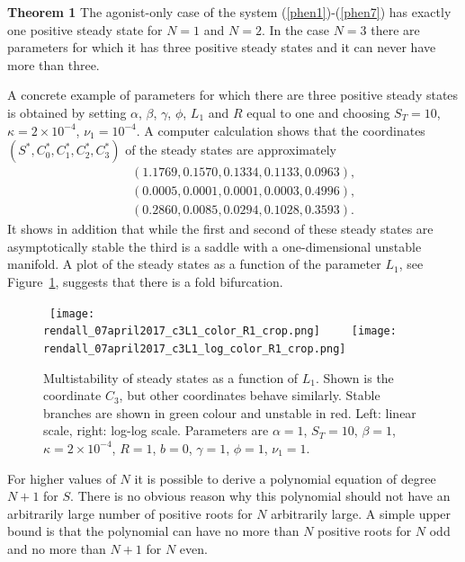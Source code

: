 \documentclass{article}
\begin{document}
\noindent
{\bf Theorem 1} The agonist-only case of the system (\ref{phen1})-(\ref{phen7})
has exactly one positive steady state for $N=1$ and $N=2$. In the case $N=3$ 
there are parameters for which it has three positive steady states and it can 
never have more than three. 

A concrete example of parameters for which there are three positive steady 
states is obtained by setting $\alpha$, $\beta$, $\gamma$, $\phi$, $L_1$ and 
$R$ equal to one and choosing $S_T=10$, $\kappa=2\times 10^{-4}$, 
$\nu_1=10^{-4}$. A computer calculation shows that the coordinates 
$(S^*,C_0^*,C_1^*,C_2^*,C_3^*)$ of the steady states are approximately 
\begin{eqnarray}
&&(1.1769,0.1570,0.1334,0.1133,0.0963),\\
&&(0.0005,0.0001,0.0001,0.0003,0.4996),\\ 
&&(0.2860,0.0085,0.0294,0.1028,0.3593). 
\end{eqnarray}
It shows in addition that while the first and second of these steady states
are asymptotically stable the third is a saddle with a one-dimensional 
unstable manifold. A plot of the steady states as a function of the parameter 
$L_1$, see Figure~\ref{fig:multistability}, suggests that there is a fold bifurcation.
\begin{figure}[ht]
\begin{center}
  \mbox{%
    \texttt{[image: rendall\_07april2017\_c3L1\_color\_R1\_crop.png]}%
\ \ \ %
\texttt{[image: rendall\_07april2017\_c3L1\_log\_color\_R1\_crop.png]}  
  }%
\end{center}
\caption{%
Multistability of steady states as a function of $L_1$.  Shown is the coordinate
$C_3$, but other coordinates behave similarly.
Stable branches are shown in green colour and unstable in red.
  Left: linear scale, right: log-log scale.
Parameters are
$\alpha =  1$,
$S_T =  10$,
$\beta =  1$,
$\kappa = 2\times10^{-4}$,
$R =  1$,
$b =   0$, %
$\gamma =  1$,
$\phi = 1$,
$\nu_1 = 1$.
}
\label{fig:multistability}
\end{figure}
For higher values of $N$ it is possible to derive a polynomial equation of 
degree $N+1$ for $S$. There is no obvious reason why this polynomial should
not have an arbitrarily large number of positive roots for $N$ arbitrarily
large. A simple upper bound is that the polynomial can have no more than 
$N$ positive roots for $N$ odd and no more than $N+1$ for $N$ even.
\end{document}
